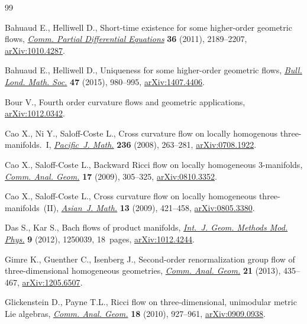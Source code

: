 \begin{thebibliography}{99}
\footnotesize\itemsep=0pt

Bahuaud E., Helliwell D., Short-time existence for some higher-order geometric
 flows, \href{https://doi.org/10.1080/03605302.2011.593015}{\textit{Comm. Partial Differential Equations}} \textbf{36} (2011), 2189--2207, \href{https://arxiv.org/abs/1010.4287}{arXiv:1010.4287}.

Bahuaud E., Helliwell D., Uniqueness for some higher-order geometric flows,
 \href{https://doi.org/10.1112/blms/bdv076}{\textit{Bull. Lond. Math. Soc.}} \textbf{47} (2015), 980--995,
 \href{https://arxiv.org/abs/1407.4406}{arXiv:1407.4406}.

Bour V., Fourth order curvature flows and geometric applications,
 \href{https://arxiv.org/abs/1012.0342}{arXiv:1012.0342}.

Cao X., Ni Y., Saloff-Coste L., Cross curvature flow on locally homogenous
 three-manifolds.~{I}, \href{https://doi.org/10.2140/pjm.2008.236.263}{\textit{Pacific~J. Math.}} \textbf{236} (2008),
 263--281, \href{https://arxiv.org/abs/0708.1922}{arXiv:0708.1922}.

Cao X., Saloff-Coste L., Backward {R}icci flow on locally homogeneous
 3-manifolds, \href{https://doi.org/10.4310/CAG.2009.v17.n2.a6}{\textit{Comm. Anal. Geom.}} \textbf{17} (2009), 305--325, \href{https://arxiv.org/abs/0810.3352}{arXiv:0810.3352}.

Cao X., Saloff-Coste L., Cross curvature flow on locally homogeneous
 three-manifolds~({II}), \href{https://doi.org/10.4310/AJM.2009.v13.n4.a1}{\textit{Asian~J. Math.}} \textbf{13} (2009), 421--458,
 \href{https://arxiv.org/abs/0805.3380}{arXiv:0805.3380}.

Das S., Kar S., Bach flows of product manifolds, \href{https://doi.org/10.1142/S0219887812500399}{\textit{Int.~J. Geom. Methods
 Mod. Phys.}} \textbf{9} (2012), 1250039, 18~pages, \href{https://arxiv.org/abs/1012.4244}{arXiv:1012.4244}.

Gimre K., Guenther C., Isenberg J., Second-order renormalization group flow of
 three-dimensional homogeneous geometries, \href{https://doi.org/10.4310/CAG.2013.v21.n2.a7}{\textit{Comm. Anal. Geom.}} \textbf{21} (2013), 435--467, \href{https://arxiv.org/abs/1205.6507}{arXiv:1205.6507}.

Glickenstein D., Payne T.L., Ricci flow on three-dimensional, unimodular metric
 {L}ie algebras, \href{https://doi.org/10.4310/CAG.2010.v18.n5.a3}{\textit{Comm. Anal. Geom.}} \textbf{18} (2010), 927--961, \href{https://arxiv.org/abs/0909.0938}{arXiv:0909.0938}.


\end{thebibliography}
